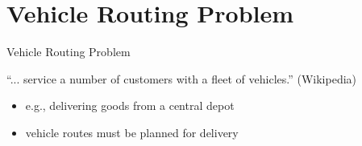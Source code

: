 \section[VRP]{Vehicle Routing Problem}

\begin{frame}{}
  \begin{center}
    \structure{\Large \insertsection}
  \end{center}
\end{frame}

\begin{frame}{Vehicle Routing Problem}

  ``... service a number of customers with a fleet of vehicles.'' 
  \hfill  {\tiny (Wikipedia) }\\
  \vspace{5pt}
  \begin{itemize}
    \item e.g., delivering goods from a central depot
    \item vehicle routes must be planned for delivery
  \end{itemize}

  \begin{center}
  \end{center}


\end{frame}

